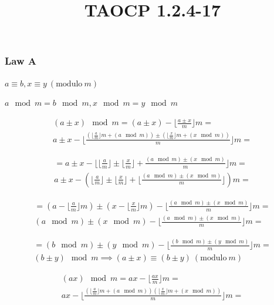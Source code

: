 \documentclass{article}
\title{TAOCP 1.2.4\mbox{-}17}
\begin{document}
\maketitle

\subsubsection*{Law A}

\( a \equiv b, x \equiv y\ (\mathrm{modulo}\ m) \)

\( a \mod m = b \mod m, x \mod m = y \mod m \)

\begin{multline*}
(a \pm x) \mod m = (a \pm x) - \lfloor \frac{a \pm x}{m} \rfloor m = \\
a \pm x - \lfloor \frac{(\lfloor\frac{a}{m}\rfloor m + (a \mod m)) \pm (\lfloor\frac{x}{m}\rfloor m + (x \mod m))}{m} \rfloor m =
\end{multline*}

\begin{multline*}
= a \pm x - \lfloor \lfloor\frac{a}{m}\rfloor \pm \lfloor\frac{x}{m} \rfloor + \frac{(a \mod m) \pm (x \mod m)}{m} \rfloor m = \\
a \pm x - (\lfloor\frac{a}{m}\rfloor \pm \lfloor\frac{x}{m} \rfloor + \lfloor \frac{(a \mod m) \pm (x \mod m)}{m} \rfloor) m =
\end{multline*}

\begin{multline*}
= (a - \lfloor\frac{a}{m} \rfloor m) \pm (x - \lfloor\frac{x}{m} \rfloor m) - \lfloor \frac{(a \mod m) \pm (x \mod m)}{m} \rfloor m = \\
(a \mod m) \pm (x \mod m) - \lfloor \frac{(a \mod m) \pm (x \mod m)}{m} \rfloor m =
\end{multline*}

\begin{multline*}
= (b \mod m) \pm (y \mod m) - \lfloor \frac{(b \mod m) \pm (y \mod m)}{m} \rfloor m = \\
(b \pm y) \mod m \implies (a \pm x) \equiv (b \pm y)\ (\mathrm{modulo}\ m)
\end{multline*}

\begin{multline*}
(ax) \mod m = ax - \lfloor \frac{ax}{m} \rfloor m = \\
ax - \lfloor \frac{(\lfloor\frac{a}{m}\rfloor m + (a \mod m))(\lfloor\frac{x}{m}\rfloor m + (x \mod m))}{m} \rfloor m =
\end{multline*}
\end{document}
